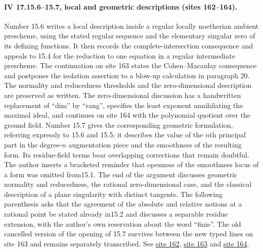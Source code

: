 \paragraph{IV 17.15.6--15.7, local and geometric descriptions (sites 162--164).}
Number 15.6 writes a local description inside a regular locally noetherian ambient prescheme, using the stated regular sequence and the elementary singular zero of its defining functions. It then records the complete-intersection consequence and appeals to 15.4 for the reduction to one equation in a regular intermediate prescheme. The continuation on site 163 states the Cohen--Macaulay consequence and postpones the isolation assertion to a blow-up calculation in paragraph 20. The normality and reducedness thresholds and the zero-dimensional description are preserved as written. The zero-dimensional discussion has a handwritten replacement of ``dim'' by ``rang'', specifies the least exponent annihilating the maximal ideal, and continues on site 164 with the polynomial quotient over the ground field. Number 15.7 gives the corresponding geometric formulation, referring expressly to 15.6 and 15.5; it describes the value of the $n$th principal part in the degree-$n$ augmentation piece and the smoothness of the resulting form. Its residue-field terms bear overlapping corrections that remain doubtful. The author inserts a bracketed reminder that openness of the smoothness locus of a form was omitted from15.1. The end of the argument discusses geometric normality and reducedness, the rational zero-dimensional case, and the classical description of a plane singularity with distinct tangents. The following parenthesis asks that the agreement of the absolute and relative notions at a rational point be stated already in15.2 and discusses a separable residue extension, with the author's own reservation about the word ``finie''. The old cancelled version of the opening of 15.7 survives between the new typed lines on site 163 and remains separately transcribed. See \href{https://grothendieck.umontpellier.fr/web/viewer.html?file=../25.pdf#page=163}{site 162}, \href{https://grothendieck.umontpellier.fr/web/viewer.html?file=../25.pdf#page=164}{site 163} and \href{https://grothendieck.umontpellier.fr/web/viewer.html?file=../25.pdf#page=165}{site 164}.

